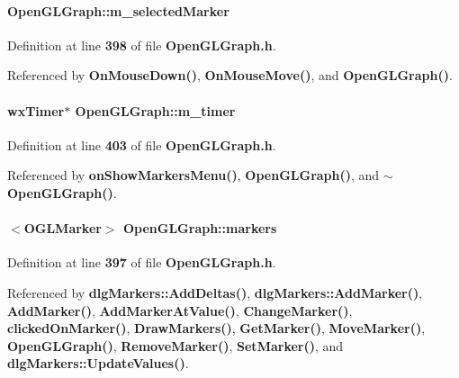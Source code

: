 \paragraph[{m\+\_\+selected\+Marker}]{ Open\+G\+L\+Graph\+::m\+\_\+selected\+Marker\hspace{0.3cm}{\ttfamily [private]}}\label{classOpenGLGraph_ac75106e1432a43878698dfe249fc669b}


Definition at line {\bf 398} of file {\bf Open\+G\+L\+Graph.\+h}.



Referenced by {\bf On\+Mouse\+Down()}, {\bf On\+Mouse\+Move()}, and {\bf Open\+G\+L\+Graph()}.

\paragraph[{m\+\_\+timer}]{\setlength{\rightskip}{0pt plus 5cm}wx\+Timer$\ast$ Open\+G\+L\+Graph\+::m\+\_\+timer\hspace{0.3cm}{\ttfamily [private]}}\label{classOpenGLGraph_ab121746c96c295a71fa572a24755a7be}


Definition at line {\bf 403} of file {\bf Open\+G\+L\+Graph.\+h}.



Referenced by {\bf on\+Show\+Markers\+Menu()}, {\bf Open\+G\+L\+Graph()}, and {\bf $\sim$\+Open\+G\+L\+Graph()}.

\paragraph[{markers}]{$<${\bf O\+G\+L\+Marker}$>$ Open\+G\+L\+Graph\+::markers\hspace{0.3cm}{\ttfamily [private]}}\label{classOpenGLGraph_ad14b1aea5b8e8ad12841191ff0fef42b}


Definition at line {\bf 397} of file {\bf Open\+G\+L\+Graph.\+h}.



Referenced by {\bf dlg\+Markers\+::\+Add\+Deltas()}, {\bf dlg\+Markers\+::\+Add\+Marker()}, {\bf Add\+Marker()}, {\bf Add\+Marker\+At\+Value()}, {\bf Change\+Marker()}, {\bf clicked\+On\+Marker()}, {\bf Draw\+Markers()}, {\bf Get\+Marker()}, {\bf Move\+Marker()}, {\bf Open\+G\+L\+Graph()}, {\bf Remove\+Marker()}, {\bf Set\+Marker()}, and {\bf dlg\+Markers\+::\+Update\+Values()}.

